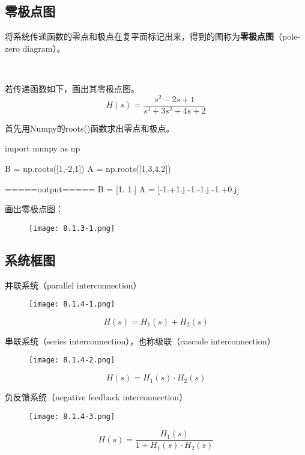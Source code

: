 \subsection{零极点图}

将系统传递函数的零点和极点在复平面标记出来，得到的图称为{\bf 零极点图}（pole-zero diagram）。

~

\begin{example}
若传递函数如下，画出其零极点图。
\[
H\left( s \right) =\frac{s^2-2s+1}{s^3+3s^2+4s+2}
\]
\end{example}

首先用Numpy的roots()函数求出零点和极点。

\begin{python}
import numpy as np

B = np.roots([1,-2,1])
A = np.roots([1,3,4,2])

=====output=====
B = [1. 1.]
A = [-1.+1.j -1.-1.j -1.+0.j]
\end{python}

画出零极点图：
\begin{figure}[h]
\centering
\texttt{[image: 8.1.3-1.png]}
\end{figure}

\subsection{系统框图}

并联系统（parallel interconnection）
\begin{figure}[h]
\centering
\texttt{[image: 8.1.4-1.png]}
\end{figure}
\[
H\left( s \right) =H_1\left( s \right) +H_2\left( s \right)
\]

串联系统（series interconnection），也称级联（cascade interconnection）
\begin{figure}[h]
\centering
\texttt{[image: 8.1.4-2.png]}
\end{figure}
\[
H\left( s \right) =H_1\left( s \right) \cdot H_2\left( s \right)
\]

负反馈系统（negative feedback interconnection）
\begin{figure}[ht]
\centering
\texttt{[image: 8.1.4-3.png]}
\end{figure}
\[
H\left( s \right) =\frac{H_1\left( s \right)}{1+H_1\left( s \right) \cdot H_2\left( s \right)}
\]


